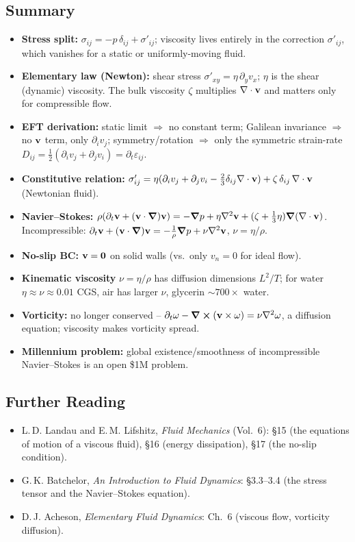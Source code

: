 \documentclass[../main.tex]{subfiles}
\begin{document}
\subsection*{Summary}
\begin{itemize}
  \item \textbf{Stress split:} $\sigma_{ij}=-p\,\delta_{ij}+\sigma'_{ij}$; viscosity lives entirely in the correction $\sigma'_{ij}$, which vanishes for a static or uniformly-moving fluid.
  \item \textbf{Elementary law (Newton):} shear stress $\sigma'_{xy}=\eta\,\partial_y v_x$; $\eta$ is the shear (dynamic) viscosity. The bulk viscosity $\zeta$ multiplies $\nabla \cdot\mathbf{v}$ and matters only for compressible flow.
  \item \textbf{EFT derivation:} static limit $\Rightarrow$ no constant term; Galilean invariance $\Rightarrow$ no $\mathbf{v}$ term, only $\partial_i v_j$; symmetry/rotation $\Rightarrow$ only the symmetric strain-rate $D_{ij}=\tfrac12(\partial_iv_j+\partial_jv_i)=\partial_t\varepsilon_{ij}$.
  \item \textbf{Constitutive relation:} $\sigma'_{ij}=\eta(\partial_iv_j+\partial_jv_i-\tfrac{2}{3}\delta_{ij}\nabla \cdot\mathbf{v})+\zeta\,\delta_{ij}\,\nabla \cdot\mathbf{v}$ (Newtonian fluid).
  \item \textbf{Navier--Stokes:} $\rho(\partial_t\mathbf{v}+(\mathbf{v}\cdot\grad)\mathbf{v})=-\grad p+\eta\nabla^2\mathbf{v}+(\zeta+\tfrac13\eta)\grad(\nabla \cdot\mathbf{v})$. Incompressible: $\partial_t\mathbf{v}+(\mathbf{v}\cdot\grad)\mathbf{v}=-\tfrac{1}{\rho}\grad p+\nu\nabla^2\mathbf{v}$, $\nu=\eta/\rho$.
  \item \textbf{No-slip BC:} $\mathbf{v}=\mathbf{0}$ on solid walls (vs.\ only $v_n=0$ for ideal flow).
  \item \textbf{Kinematic viscosity} $\nu=\eta/\rho$ has diffusion dimensions $L^2/T$; for water $\eta\approx\nu\approx0.01$ CGS, air has larger $\nu$, glycerin $\sim700\times$ water.
  \item \textbf{Vorticity:} no longer conserved -- $\partial_t\mathbf{\omega}-\curl(\mathbf{v}\times\mathbf{\omega})=\nu\nabla^2\mathbf{\omega}$, a diffusion equation; viscosity makes vorticity spread.
  \item \textbf{Millennium problem:} global existence/smoothness of incompressible Navier--Stokes is an open \$1M problem.
\end{itemize}

\subsection*{Further Reading}
\begin{itemize}
  \item L.\,D. Landau and E.\,M. Lifshitz, \textit{Fluid Mechanics} (Vol.\ 6): \S15 (the equations of motion of a viscous fluid), \S16 (energy dissipation), \S17 (the no-slip condition).
  \item G.\,K. Batchelor, \textit{An Introduction to Fluid Dynamics}: \S3.3--3.4 (the stress tensor and the Navier--Stokes equation).
  \item D.\,J. Acheson, \textit{Elementary Fluid Dynamics}: Ch.\ 6 (viscous flow, vorticity diffusion).
\end{itemize}
\end{document}
